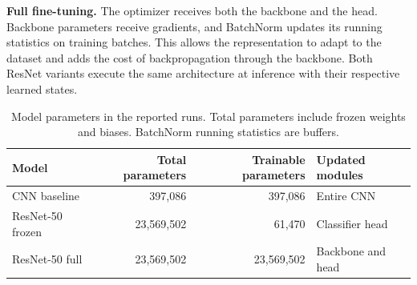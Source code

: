 \textbf{Full fine-tuning.} The optimizer receives both the backbone and the head. Backbone parameters receive gradients, and BatchNorm updates its running statistics on training batches. This allows the representation to adapt to the dataset and adds the cost of backpropagation through the backbone. Both ResNet variants execute the same architecture at inference with their respective learned states.

\begin{table}[H]
    \centering
    \caption{Model parameters in the reported runs. Total parameters include frozen weights and biases. BatchNorm running statistics are buffers.}
    \label{tab:a2-model-parameters}
    \begin{tabular}{lrrl}
        \toprule
        Model & Total parameters & Trainable parameters & Updated modules \\
        \midrule
        CNN baseline & 397,086 & 397,086 & Entire CNN \\
        ResNet-50 frozen & 23,569,502 & 61,470 & Classifier head \\
        ResNet-50 full & 23,569,502 & 23,569,502 & Backbone and head \\
        \bottomrule
    \end{tabular}
\end{table}
